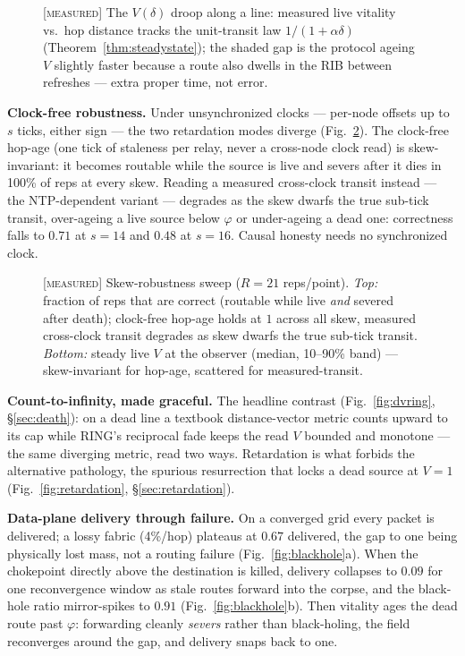 \documentclass[11pt]{article}
\theoremstyle{plain}
\numberwithin{equation}{section}
\begin{document}
\begin{figure}[tbp]
\centering

\caption{\textsc{[measured]} The $V(\delta)$ droop along a line: measured live vitality vs.\ hop distance tracks the unit-transit law $1/(1+\alpha\delta)$ (Theorem~\ref{thm:steadystate}); the shaded gap is the protocol ageing $V$ slightly faster because a route also dwells in the RIB between refreshes — extra proper time, not error.}
\label{fig:vdroop}
\end{figure}

\textbf{Clock-free robustness.} Under unsynchronized clocks — per-node offsets up to $s$ ticks, either sign — the two retardation modes diverge (Fig.~\ref{fig:skew}). The clock-free hop-age (one tick of staleness per relay, never a cross-node clock read) is skew-invariant: it becomes routable while the source is live and severs after it dies in 100\% of reps at every skew. Reading a measured cross-clock transit instead — the NTP-dependent variant — degrades as the skew dwarfs the true sub-tick transit, over-ageing a live source below $\varphi$ or under-ageing a dead one: correctness falls to $0.71$ at $s=14$ and $0.48$ at $s=16$. Causal honesty needs no synchronized clock.

\begin{figure}[tbp]
\centering

\caption{\textsc{[measured]} Skew-robustness sweep ($R=21$ reps/point). \emph{Top:} fraction of reps that are correct (routable while live \emph{and} severed after death); clock-free hop-age holds at $1$ across all skew, measured cross-clock transit degrades as skew dwarfs the true sub-tick transit. \emph{Bottom:} steady live $V$ at the observer (median, 10--90\% band) — skew-invariant for hop-age, scattered for measured-transit.}
\label{fig:skew}
\end{figure}

\textbf{Count-to-infinity, made graceful.} The headline contrast (Fig.~\ref{fig:dvring}, §\ref{sec:death}): on a dead line a textbook distance-vector metric counts upward to its cap while RING's reciprocal fade keeps the read $V$ bounded and monotone — the same diverging metric, read two ways. Retardation is what forbids the alternative pathology, the spurious resurrection that locks a dead source at $V=1$ (Fig.~\ref{fig:retardation}, §\ref{sec:retardation}).

\textbf{Data-plane delivery through failure.} On a converged grid every packet is delivered; a lossy fabric (4\%/hop) plateaus at $0.67$ delivered, the gap to one being physically lost mass, not a routing failure (Fig.~\ref{fig:blackhole}a). When the chokepoint directly above the destination is killed, delivery collapses to $0.09$ for one reconvergence window as stale routes forward into the corpse, and the black-hole ratio mirror-spikes to $0.91$ (Fig.~\ref{fig:blackhole}b). Then vitality ages the dead route past $\varphi$: forwarding cleanly \emph{severs} rather than black-holing, the field reconverges around the gap, and delivery snaps back to one.
\end{document}
